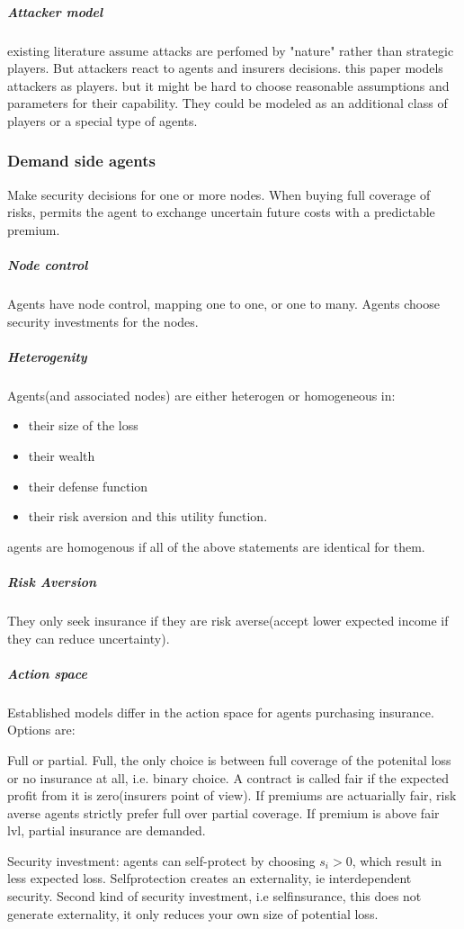 \subparagraph{Attacker model}
existing literature assume attacks are perfomed by "nature" rather than strategic players.
 But attackers react to agents and insurers decisions. this paper models attackers as
  players. but it might be hard to choose reasonable assumptions and parameters for their capability. They could be modeled as an additional class of players or a special type of agents.
\subsubsection{Demand side agents}
Make security decisions for one or more nodes. When buying full coverage of risks, permits
 the agent to exchange uncertain future costs with a predictable premium. 
 \subparagraph{Node control}
 
Agents have node control, mapping one to one, or one to many. Agents choose security investments for the nodes.
\subparagraph{Heterogenity}
 Agents(and associated nodes) are either heterogen or homogeneous in:
\begin{itemize}
\item  their size of the loss
\item  their wealth
\item  their defense function
\item   their risk aversion and this utility function.
\end{itemize}
agents are homogenous if all of the above statements are identical for them.
\subparagraph{Risk Aversion} 
 They only seek insurance if they are risk averse(accept lower expected income if they can reduce uncertainty).
\subparagraph{Action space}
 Established models differ in the action space for agents purchasing insurance.
 Options are:
 
 Full or partial. Full, the only choice is between full coverage of the potenital loss or no insurance at all, i.e. binary choice.
A contract is called fair if the expected profit from it is zero(insurers point of view).
 If premiums are actuarially fair, risk averse agents strictly prefer full over partial coverage. 
If premium is above fair lvl, partial insurance are demanded. 

Security investment: agents can self-protect by choosing $s_{i}>0$, which result in less expected loss. 
Selfprotection creates an externality, ie interdependent security.
Second kind of security investment, i.e selfinsurance, this does not generate externality, 
it only reduces your own size of potential loss. 

